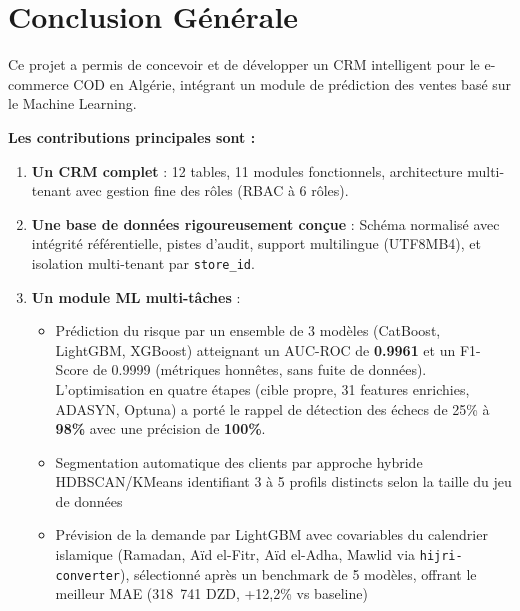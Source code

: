 \documentclass[12pt,a4paper]{report}
\begin{document}
\chapter*{Conclusion G\'{e}n\'{e}rale}

Ce projet a permis de concevoir et de d\'{e}velopper un CRM intelligent pour le e-commerce COD en Alg\'{e}rie, int\'{e}grant un module de pr\'{e}diction des ventes bas\'{e} sur le Machine Learning.

\textbf{Les contributions principales sont :}

\begin{enumerate}
  \item \textbf{Un CRM complet} : 12 tables, 11 modules fonctionnels, architecture multi-tenant avec gestion fine des r\^{o}les (RBAC \`{a} 6 r\^{o}les).

  \item \textbf{Une base de donn\'{e}es rigoureusement con\c{c}ue} : Sch\'{e}ma normalis\'{e} avec int\'{e}grit\'{e} r\'{e}f\'{e}rentielle, pistes d'audit, support multilingue (UTF8MB4), et isolation multi-tenant par \texttt{store\_id}.

  \item \textbf{Un module ML multi-t\^{a}ches} :
  \begin{itemize}
    \item Pr\'{e}diction du risque par un ensemble de 3 mod\`{e}les (CatBoost, LightGBM, XGBoost) atteignant un AUC-ROC de \textbf{0.9961} et un F1-Score de 0.9999 (m\'{e}triques honn\^{e}tes, sans fuite de donn\'{e}es). L'optimisation en quatre \'{e}tapes (cible propre, 31 features enrichies, ADASYN, Optuna) a port\'{e} le rappel de d\'{e}tection des \'{e}checs de 25\% \`{a} \textbf{98\%} avec une pr\'{e}cision de \textbf{100\%}.
    \item Segmentation automatique des clients par approche hybride HDBSCAN/KMeans identifiant 3 \`{a} 5 profils distincts selon la taille du jeu de donn\'{e}es
    \item Pr\'{e}vision de la demande par LightGBM avec covariables du calendrier islamique (Ramadan, A\"{i}d el-Fitr, A\"{i}d el-Adha, Mawlid via \texttt{hijri-converter}), s\'{e}lectionn\'{e} apr\`{e}s un benchmark de 5 mod\`{e}les, offrant le meilleur MAE (318~741 DZD, +12,2\% vs baseline)
  \end{itemize}


\end{enumerate}
\end{document}
